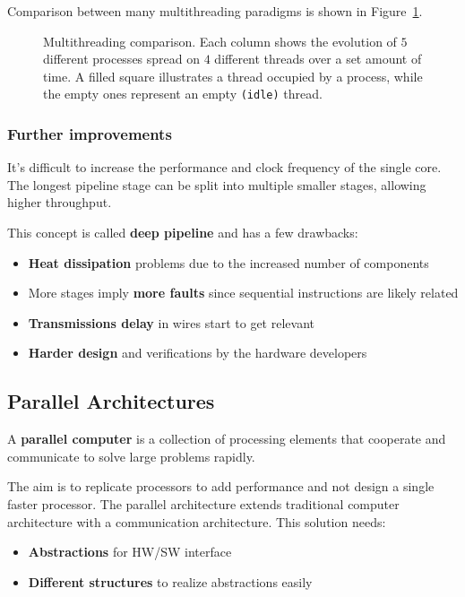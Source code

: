 \documentclass[english]{article}
\begin{document}
Comparison between many multithreading paradigms is shown in Figure~\ref{fig:multithreading-comparison}.

\begin{figure}[htbp]
  \bigskip
  \centering
  \caption{\centering Multithreading comparison. Each column shows the evolution of \(5\) different processes spread on \(4\) different threads over a set amount of time.
    A filled square illustrates a thread occupied by a process, while the empty ones represent an empty \texttt{(idle)} thread.}
  \label{fig:multithreading-comparison}
  \bigskip
\end{figure}

\subsubsection{Further improvements}

It's difficult to increase the performance and clock frequency of the single core.
The longest pipeline stage can be split into multiple smaller stages, allowing higher throughput.

This concept is called \textbf{deep pipeline} and has a few drawbacks:

\begin{itemize}
  \item \textbf{Heat dissipation} problems due to the increased number of components
  \item More stages imply \textbf{more faults} since sequential instructions are likely related
  \item \textbf{Transmissions delay} in wires start to get relevant
  \item \textbf{Harder design} and verifications by the hardware developers
\end{itemize}

\subsection{Parallel Architectures}

A \textbf{parallel computer} is a collection of processing elements that cooperate and communicate to solve large problems rapidly.

The aim is to replicate processors to add performance and not design a single faster processor.
The parallel architecture extends traditional computer architecture with a communication architecture.
This solution needs:

\begin{itemize}
  \item \textbf{Abstractions} for HW/SW interface
  \item \textbf{Different structures} to realize abstractions easily
\end{itemize}
\end{document}
